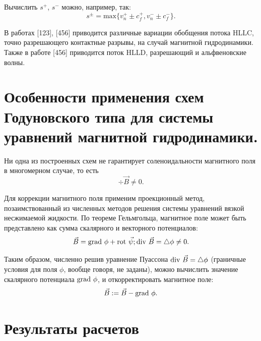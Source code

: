 \documentclass[14pt, a4paper, fleqn]{extreport}
\begin{document}
	Вычислить $s^{+}$, $s^{-}$ можно, например, так:
	\begin{equation*}
		s^{\pm} = \text{max}\big\lbrace v_n^{+} \pm c_f^{+}, v_n^{-} \pm c_f^{-} \big\rbrace.
	\end{equation*}
	
	В работах [123], [456] приводится различные вариации обобщения потока HLLC, 
	точно разрешающего контактные разрывы, на случай магнитной гидродинамики.
	Также в работе [456] приводится поток HLLD, разрешающий и альфвеновские волны.
	
		
	\section{Особенности применения схем Годуновского типа для системы уравнений 
			 магнитной гидродинамики.}
	
	Ни одна из построенных схем не гарантирует соленоидальности магнитного поля
	в многомерном случае, то есть
	\begin{equation*}
		\div{\vec{B}} \ne 0.
	\end{equation*}
	
	Для коррекции магнитного поля применим проекционный метод, 
	позаимствованный из численных методов решения системы уравнений вязкой 
	несжимаемой жидкости. 
	По теореме Гельмгольца, магнитное поле может быть представлено как
	сумма скалярного и векторного потенциалов:
	\begin{equation*}
		\vec{B} = \text{grad }{\phi} + \text{rot }{\vec{\psi}}; 
		\text{div }{\vec{B}} = \mathop{}\!\mathbin\bigtriangleup{\phi} \ne 0.
	\end{equation*}
	
	Таким образом, численно решив уравнение Пуассона 
	$\text{div }{\vec{B}} = \mathop{}\!\mathbin\bigtriangleup{\phi}$ 
	(граничные условия для поля $\phi$, вообще говоря, не заданы), 
	можно вычислить значение скалярного потенциала $\text{grad }{\phi}$,
	и откорректировать магнитное поле:
	\begin{equation*}
		\vec{B} := \vec{B} - \text{grad }{\phi}.
	\end{equation*}
	
	\section{Результаты расчетов}
	
\end{document}
